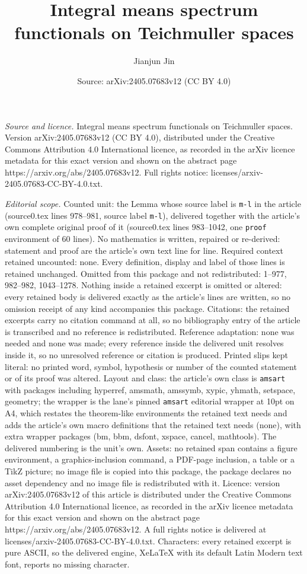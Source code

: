 \documentclass[10pt,a4paper]{amsart}
\title[Integral means spectrum functionals on Teichmuller spaces]{Integral means spectrum functionals on Teichmuller spaces}
\author{Jianjun Jin}
\date{Source: arXiv:2405.07683v12 (CC BY 4.0)}
\begin{document}
\maketitle

\noindent\emph{Source and licence.} Integral means spectrum functionals on Teichmuller spaces. Version arXiv:2405.07683v12 (CC BY 4.0), distributed under the Creative Commons Attribution 4.0 International licence, as recorded in the arXiv licence metadata for this exact version and shown on the abstract page https://arxiv.org/abs/2405.07683v12. Full rights notice: licenses/arxiv-2405.07683-CC-BY-4.0.txt.\par\smallskip

\noindent\textit{Editorial scope.} Counted unit: the Lemma whose source label is \texttt{m-l} in the article (source0.tex lines 978--981, source label \texttt{m-l}), delivered together with the article's own complete original proof of it (source0.tex lines 983--1042, one \texttt{proof} environment of 60 lines). No mathematics is written, repaired or re-derived: statement and proof are the article's own text line for line. Required context retained uncounted: none. Every definition, display and label of those lines is retained unchanged. Omitted from this package and not redistributed: 1--977, 982--982, 1043--1278. Nothing inside a retained excerpt is omitted or altered: every retained body is delivered exactly as the article's lines are written, so no omission receipt of any kind accompanies this package. Citations: the retained excerpts carry no citation command at all, so no bibliography entry of the article is transcribed and no reference is redistributed. Reference adaptation: none was needed and none was made; every reference inside the delivered unit resolves inside it, so no unresolved reference or citation is produced. Printed slips kept literal: no printed word, symbol, hypothesis or number of the counted statement or of its proof was altered. Layout and class: the article's own class is \texttt{amsart} with packages including hyperref, amsmath, amssymb, xypic, yhmath, setspace, geometry; the wrapper is the lane's pinned \texttt{amsart} editorial wrapper at 10pt on A4, which restates the theorem-like environments the retained text needs and adds the article's own macro definitions that the retained text needs (none), with extra wrapper packages (bm, bbm, dsfont, xspace, cancel, mathtools). The delivered numbering is the unit's own. Assets: no retained span contains a figure environment, a graphics-inclusion command, a PDF-page inclusion, a table or a TikZ picture; no image file is copied into this package, the package declares no asset dependency and no image file is redistributed with it. Licence: version arXiv:2405.07683v12 of this article is distributed under the Creative Commons Attribution 4.0 International licence, as recorded in the arXiv licence metadata for this exact version and shown on the abstract page https://arxiv.org/abs/2405.07683v12. A full rights notice is delivered at licenses/arxiv-2405.07683-CC-BY-4.0.txt. Characters: every retained excerpt is pure ASCII, so the delivered engine, XeLaTeX with its default Latin Modern text font, reports no missing character.
\end{document}
